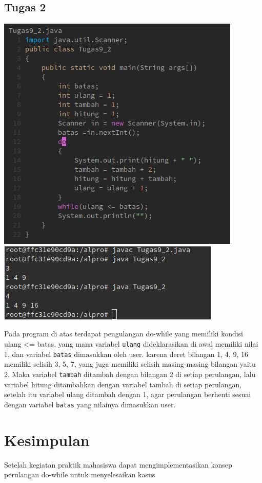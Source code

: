 \documentclass[a4paper,12pt]{article}
\begin{document}
\subsection{Tugas 2}
\begin{center}
	\includegraphics[scale=.5]{tugas2}
	\includegraphics[scale=.5]{tugas2_2}
\end{center}
Pada program di atas terdapat pengulangan do-while yang memiliki kondisi ulang <= batas, yang mana variabel \texttt{ulang} dideklarasikan di awal memiliki nilai 1, dan variabel \texttt{batas} dimasukkan oleh user.
karena deret bilangan 1, 4, 9, 16 memiliki selisih 3, 5, 7, yang juga memiliki selisih masing-masing bilangan yaitu 2. Maka variabel \texttt{tambah} ditambah dengan bilangan 2 di setiap perulangan, lalu variabel hitung ditambahkan dengan variabel tambah di setiap perulangan, setelah itu variabel ulang ditambah dengan 1, agar perulangan berhenti sesuai dengan variabel \texttt{batas} yang nilainya dimasukkan user.

\newpage

\section{Kesimpulan}
Setelah kegiatan praktik mahasiswa dapat mengimplementasikan konsep perulangan do-while untuk menyelesaikan kasus
\end{document}
